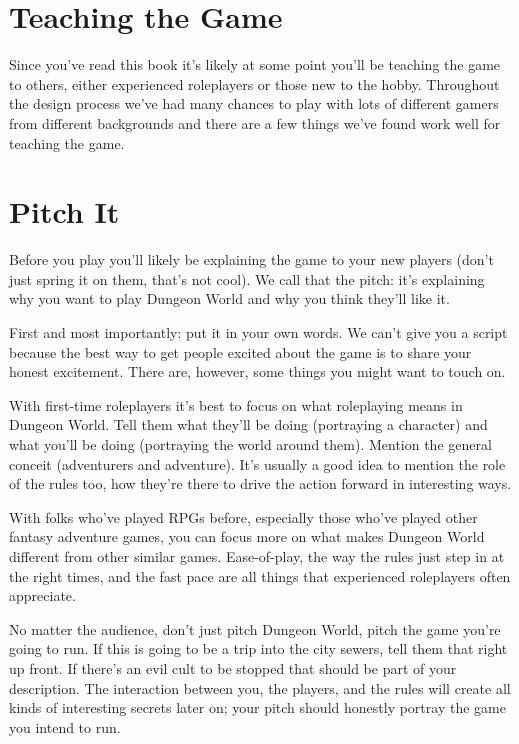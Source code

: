 \section{Teaching the Game}


Since you've read this book it's likely at some point you'll be teaching the game to others, either experienced roleplayers or those new to the hobby. Throughout the design process we've had many chances to play with lots of different gamers from different backgrounds and there are a few things we've found work well for teaching the game.
\section*{Pitch It}


Before you play you'll likely be explaining the game to your new players (don't just spring it on them, that's not cool). We call that the pitch: it's explaining why you want to play Dungeon World and why you think they'll like it.


First and most importantly: put it in your own words. We can't give you a script because the best way to get people excited about the game is to share your honest excitement. There are, however, some things you might want to touch on.


With first-time roleplayers it's best to focus on what roleplaying means in Dungeon World. Tell them what they'll be doing (portraying a character) and what you'll be doing (portraying the world around them). Mention the general conceit (adventurers and adventure). It's usually a good idea to mention the role of the rules too, how they're there to drive the action forward in interesting ways.


With folks who've played RPGs before, especially those who've played other fantasy adventure games, you can focus more on what makes Dungeon World different from other similar games. Ease-of-play, the way the rules just step in at the right times, and the fast pace are all things that experienced roleplayers often appreciate.


No matter the audience, don't just pitch Dungeon World, pitch the game you're going to run. If this is going to be a trip into the city sewers, tell them that right up front. If there's an evil cult to be stopped that should be part of your description. The interaction between you, the players, and the rules will create all kinds of interesting secrets later on; your pitch should honestly portray the game you intend to run.
